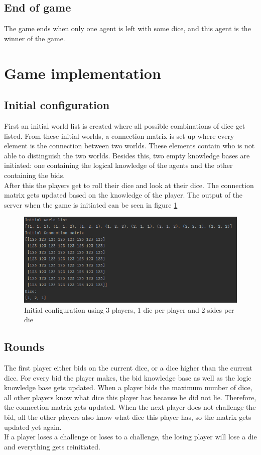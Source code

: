\documentclass{article}
\begin{document}
\subsection*{End of game} %
The game ends when only one agent is left with some dice, and this agent is the winner of the game.

\section*{Game implementation}
\subsection*{Initial configuration}
First an initial world list is created where all possible combinations of dice get listed. From these initial worlds, a connection matrix is set up where every element is the connection between two worlds. These elements contain who is not able to distinguish the two worlds. Besides this, two empty knowledge bases are initiated: one containing the logical knowledge of the agents and the other containing the bids.\\
After this the players get to roll their dice and look at their dice. The connection matrix gets updated based on the knowledge of the player. The output of the server when the game is initiated can be seen in figure \ref{fig:initc}
\begin{figure}[h!]
    \centering
    \includegraphics[width=\textwidth]{img/initialconfig.png}
    \caption{Initial configuration using 3 players, 1 die per player and 2 sides per die}
    \label{fig:initc}
\end{figure}
\subsection*{Rounds}
The first player either bids on the current dice, or a dice higher than the current dice. 
For every bid the player makes, the bid knowledge base as well as the logic knowledge base gets updated. When a player bids the maximum number of dice, all other players know what dice this player has because he did not lie. Therefore, the connection matrix gets updated. When the next player does not challenge the bid, all the other players also know what dice this player has, so the matrix gets updated yet again.\\
If a player loses a challenge or loses to a challenge, the losing player will lose a die and everything gets reinitiated.
\end{document}
